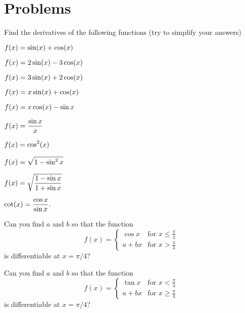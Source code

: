 \section{Problems} 
\problemfont 
\begin{multicols}{2}\setlength{\parindent}{0pt}
\noindent Find the derivatives of the following functions (try to simplify
your answers)




\problem $\displaystyle f(x) = \sin(x) + \cos(x) $ 




\problem $\displaystyle f(x) = 2\sin(x) - 3\cos(x) $ 




\problem $\displaystyle f(x) = 3\sin(x) + 2\cos(x) $ 




\problem $\displaystyle f(x) = x\sin(x) + \cos(x) $ 




\problem $\displaystyle f(x) = x\cos(x) -\sin x $ 




\problem $\displaystyle f(x) = \frac{\sin x}{x} $ 




\problem $\displaystyle f(x) = \cos^2(x) $ 




\problem $\displaystyle f(x) = \sqrt{1-\sin^2 x} $ 




\problem $\displaystyle f(x) = \sqrt{\frac{1-\sin x}{1+\sin x}} $ 




\problem $\displaystyle \cot(x) = \frac{\cos x}{\sin x}.$ 




\problem Can you find $a$ and $b$ so that the function 
\[
f(x) = \begin{cases}
  \cos x & \text{for $x\leq \frac\pi4$} \\
  a+bx   & \text{for $x > \frac\pi4$}
\end{cases}
\]
is differentiable at $x=\pi/4$?








\problem Can you find $a$ and $b$ so that the function 
\[
f(x) = \begin{cases}
  \tan x & \text{for $x< \frac\pi4$} \\
  a+bx   & \text{for $x\geq\frac\pi4$}
\end{cases}
\]
is differentiable at $x=\pi/4$?





\end{multicols}
